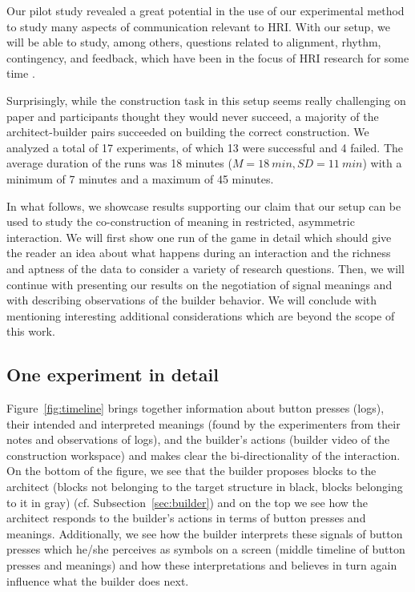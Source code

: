 Our pilot study revealed a great potential in the use of our experimental method to study many aspects of communication relevant to HRI. With our setup, we will be able to study, among others, questions related to alignment, rhythm, contingency, and feedback, which have been in the focus of HRI research for some time \cite{kopp2010social,michalowski2007dancing,fischer2013impact,vollmer2014robots,pitsch2013robot,wrede2010appropriate}.

Surprisingly, while the construction task in this setup seems really challenging on paper and participants thought they would never succeed, a majority of the architect-builder pairs succeeded on building the correct construction. We analyzed a total of 17 experiments, of which 13 were successful and 4 failed. The average duration of the runs was 18 minutes ($M = 18~min, SD = 11~min$) with a minimum of 7 minutes and a maximum of 45 minutes.

In what follows, we showcase results supporting our claim that our setup can be used to study the co-construction of meaning in restricted, asymmetric interaction. We will first show one run of the game in detail which should give the reader an idea about what happens during an interaction and the richness and aptness of the data to consider a variety of research questions. Then, we will continue with presenting our results on the negotiation of signal meanings and with describing observations of the builder behavior. We will conclude with mentioning interesting additional considerations which are beyond the scope of this work.

\subsection{One experiment in detail} 
\label{sec:case}

Figure~\ref{fig:timeline} brings together information about button presses (logs), their intended and interpreted meanings (found by the experimenters from their notes and observations of logs), and the builder's actions (builder video of the construction workspace) and makes clear the bi-directionality of the interaction. On the bottom of the figure, we see that the builder proposes blocks to the architect (blocks not belonging to the target structure in black, blocks belonging to it in gray) (cf. Subsection~\ref{sec:builder}) and on the top we see how the architect responds to the builder's actions in terms of button presses and meanings. Additionally, we see how the builder interprets these signals of button presses which he/she perceives as symbols on a screen (middle timeline of button presses and meanings) and how these interpretations and believes in turn again influence what the builder does next.

